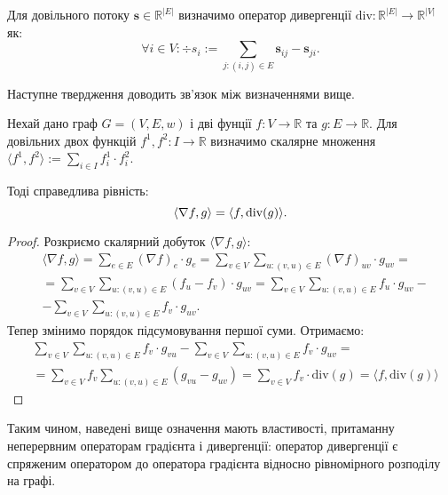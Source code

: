 \begin{definition}
    \label{def:div}
    Для довільного потоку $\mathbf s \in \mathbb{R}^{|E|}$ визначимо оператор дивергенції
    $\text{div} : \mathbb{R}^{|E|} \to \mathbb{R}^{|V|}$ як:
    $$
        \forall i \in V : \div{s}_i := \sum_{j: (i, j) \in E} \mathbf{s}_{ij} - \mathbf{s}_{ji}.
    $$
\end{definition}

Наступне твердження доводить зв'язок між визначеннями вище.

\begin{claim}
    Нехай дано граф $G = (V, E, w)$ і дві фунції $f : V \to \mathbb{R}$ та $g : E \to \mathbb{R}$.
    Для довільних двох функцій $f^1, f^2 : I \to \mathbb{R}$ визначимо скалярне множення 
    $\langle f^1, f^2 \rangle := \sum_{i \in I} f^1_i \cdot f^2_i$.

    Тоді справедлива рівність:
    \begin{equation*}
        \langle \nabla f, g \rangle = \langle f, \textnormal{div}(g) \rangle.
    \end{equation*}
\end{claim}
\begin{proof}
    Розкриємо скалярний добуток $\langle \nabla f, g \rangle$:
    \begin{align*}
        &\langle \nabla f, g \rangle = \sum_{e \in E} (\nabla f)_e \cdot g_e =
        \sum_{v \in V} \sum_{u : (v, u) \in E} (\nabla f)_{uv} \cdot g_{uv} = \\
        &=\sum_{v \in V} \sum_{u : (v, u) \in E} (f_u - f_v) \cdot g_{uv} =
        \sum_{v \in V} \sum_{u : (v, u) \in E} f_u \cdot g_{uv} - \\
        &-\sum_{v \in V} \sum_{u : (v, u) \in E} f_v \cdot g_{uv}.
    \end{align*}
    Тепер змінимо порядок підсумовування першої суми. Отримаємо:
    \begin{align*}
        &\sum_{v \in V} \sum_{u : (v, u) \in E} f_v \cdot g_{vu} - \sum_{v \in V} \sum_{u : (v, u) \in E} f_v \cdot g_{uv} = \\
        &= \sum_{v \in V} f_v \sum_{u : (v, u) \in E} (g_{vu} - g_{uv}) =
        \sum_{v \in V} f_v \cdot \text{div}(g) = \langle f, \text{div}(g) \rangle
    \end{align*}
\end{proof}

Таким чином, наведені вище означення мають властивості, 
притаманну неперервним операторам градієнта і дивергенції: оператор дивергенції є спряженим оператором до оператора градієнта
відносно рівномірного розподілу на графі.

